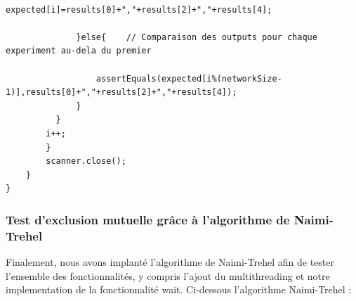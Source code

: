 \documentclass{article}
\begin{document}
\begin{lstlisting}
				  expected[i]=results[0]+","+results[2]+","+results[4];
			  
			  }else{	// Comparaison des outputs pour chaque experiment au-dela du premier
				  
				  assertEquals(expected[i%(networkSize-1)],results[0]+","+results[2]+","+results[4]);
			  }
		  }
		i++;
		}
		scanner.close();
	}
}
			\end{lstlisting}

			 \subsubsection{Test d'exclusion mutuelle grâce à l'algorithme de Naimi-Trehel}
			Finalement, nous avons implanté l'algorithme de Naimi-Trehel afin de tester l'ensemble des fonctionnalités, y compris l'ajout du multithreading et notre implementation de la fonctionnalité wait.
			\newline
			Ci-dessous l'algorithme Naimi-Trehel :
\end{document}
